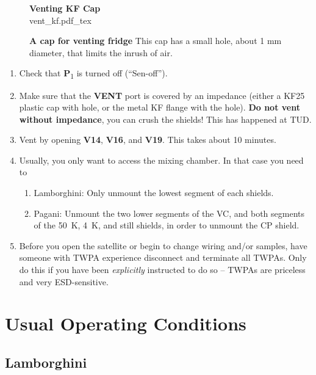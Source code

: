 \documentclass{article}[18pt,A4]
\newcommand{\thing}[1]{{\color{gray}\textsc{ \textbf{#1}}}}
\newcommand{\valve}[1]{{\color{gray}\textbf{V#1}}}
\newcommand{\pressure}[1]{{\color{pressurecolor}\textbf{P}\textsubscript{#1}}}
\begin{document}
\begin{figure}[ht]
\centering
\textbf{\color{sectioncolor}Venting KF Cap}\\
{vent_kf.pdf_tex}
\caption{\textbf{A cap for venting fridge}
This cap has a small hole, about 1 mm diameter, that limits the inrush of air.
}
\end{figure}


\begin{enumerate}
    \item Check that \pressure{1} is turned off (``Sen-off'').
    \item Make sure that the \thing{VENT} port is covered by an impedance (either a KF25 plastic cap with hole, or the metal KF flange with the hole).
    \textbf{Do not vent without impedance}, you can crush the shields! This has happened at TUD. 
    \item Vent by opening \valve{14}, \valve{16}, and \valve{19}. This takes about 10 minutes. 
    \item Usually, you only want to access the mixing chamber. In that case you need to
        \begin{enumerate}
        \item Lamborghini: Only unmount the lowest segment of each shields. 
        \item Pagani: Unmount the two lower segments of the VC, and both segments of the 50~K, 4~K, and still shields, in order to unmount the CP shield.
        \end{enumerate}
    \item Before you open the satellite or begin to change wiring and/or samples, have someone with TWPA experience disconnect and terminate all TWPAs.
    Only do this if you have been \emph{explicitly} instructed to do so -- TWPAs are priceless and very ESD-sensitive.
\end{enumerate}



\newpage
\section{Usual Operating Conditions}

\subsection{Lamborghini}
\end{document}
